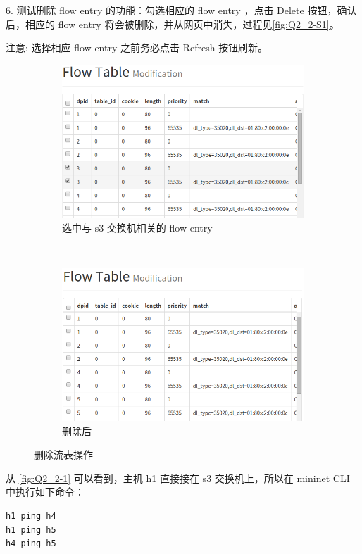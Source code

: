 \documentclass[format=draft,language=chinese,category=SDN]{hustreport}
\begin{document}
6. 测试删除 flow entry 的功能：勾选相应的 flow entry ，点击 Delete 按钮，确认后，相应的 flow entry 将会被删除，并从网页中消失，过程见\autoref{fig:Q2_2-S1}。

注意: 选择相应 flow entry 之前务必点击 Refresh 按钮刷新。

\begin{figure}[!h]
\centering
  \begin{subfigure}[b]{.45\textwidth}
  \includegraphics[width=\textwidth]{fig/2_2-4}
  \caption{选中与 s3 交换机相关的 flow entry}\label{fig:Q2_2-4}
  \end{subfigure}
  ~
  \begin{subfigure}[b]{.45\textwidth}
  \includegraphics[width=\textwidth]{fig/2_2-5}
  \caption{删除后}\label{fig:Q2_2-5}
  \end{subfigure}
\caption{删除流表操作}\label{fig:Q2_2-S1}
\end{figure}

从 \autoref{fig:Q2_2-1} 可以看到，主机 h1 直接接在 s3 交换机上，所以在 mininet CLI 中执行如下命令：
\begin{lstlisting}
h1 ping h4
h1 ping h5
h4 ping h5
\end{lstlisting}
\end{document}
